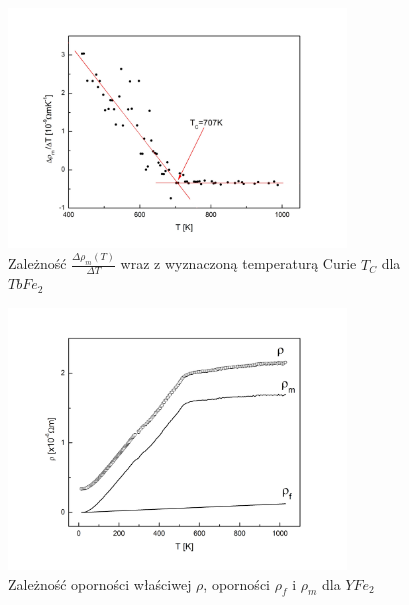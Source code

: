 \documentclass[a4paper,12pt]{article}
\numberwithin{equation}{section}
\begin{document}
\begin{figure}[ht]
    \centering
    \includegraphics[width =0.8\textwidth]{../img/opor/pochodnaTb}
    \caption{Zależność $\frac{\Delta\rho_m(T)}{\Delta T}$ wraz z wyznaczoną temperaturą Curie $T_C$ dla $TbFe_2$}
    \label{skladoweTb}
\end{figure}




\begin{figure}[ht]
    \centering
    \includegraphics[width =0.8\textwidth]{../img/opor/skladoweY}
    \caption{Zależność oporności właściwej $\rho$, oporności $\rho_f$ i $\rho_m$ dla $YFe_2$}
    \label{skladoweY}
\end{figure}
\end{document}
